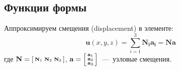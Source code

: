 \documentclass[12pt,a4paper,fleqn]{article}
\begin{document}
	\subsection{Функции формы}
		Аппроксимируем смещения (displacement) в элементе:
		\begin{equation}
			\mathbf{u}(x,y,z) = \sum_{i = 1}^3{\mathbf{N_ia_i}} = \mathbf{Na}
		\end{equation}
		где $\mathbf{N} = \left[ \begin{smallmatrix} \mathbf{N}_1 & \mathbf{N}_2 & \mathbf{N}_3 \end{smallmatrix} \right]$, 
			$\mathbf{a} = \left[ \begin{smallmatrix} \mathbf{a}_1 \\ \mathbf{a}_2 \\ \mathbf{a}_3 \end{smallmatrix} \right]$~---~узловые смещения.
\end{document}
